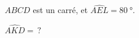 
\begin{mental}
    \( ABCD\) est un carré, et \( \widehat{AEL}=\SI{80}{\degree}\).


    \begin{center}

    \end{center}


    \( \widehat{AKD}=\,?\)
\end{mental}
